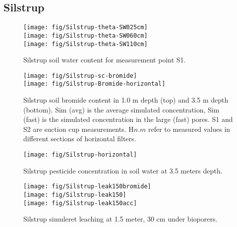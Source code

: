 \subsection*{Silstrup}

\begin{figure}[htbp]
  \begin{center}
    \texttt{[image: fig/Silstrup-theta-SW025cm]}\\
    \texttt{[image: fig/Silstrup-theta-SW060cm]}\\
    \texttt{[image: fig/Silstrup-theta-SW110cm]}
  \end{center}
  \caption{Silstrup soil water content for measurement point S1.}
  \label{fig:Silstrup-theta}
\end{figure}\FloatBarrier

\begin{figure}[htbp]
  \begin{center}
    \texttt{[image: fig/Silstrup-sc-bromide]}\\
    \texttt{[image: fig/Silstrup-Bromide-horizontal]}
  \end{center}
  \caption{Silstrup soil bromide content in 1.0 m depth (top) and 3.5
    m depth (bottom).  Sim (avg) is the average simulated
    concentration, Sim (fast) is the simulated concentration in the
    large (fast) pores.  S1 and S2 are suction cup measurements.
    H$n$.$m$ refer to measured values in different sections of
    horizontal filters.}
  \label{fig:Silstrup-bromide}
\end{figure}\FloatBarrier

\begin{figure}[htbp]
  \begin{center}
    \texttt{[image: fig/Silstrup-horizontal]}
  \end{center}
  \caption{Silstrup pesticide concentration in soil water at 3.5 meters depth.}
  \label{fig:Silstrup-horizontal}
\end{figure}\FloatBarrier

\begin{figure}[htbp]
  \begin{center}
    \texttt{[image: fig/Silstrup-leak150bromide]}\\
    \texttt{[image: fig/Silstrup-leak150]}\\
    \texttt{[image: fig/Silstrup-leak150acc]}
  \end{center}
  \caption{Silstrup simuleret leaching at 1.5 meter, 30 cm under bioporers.}
  \label{fig:Silstrup-leak150}
\end{figure}\FloatBarrier

